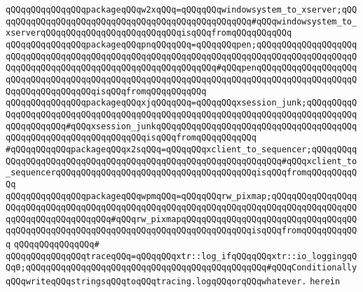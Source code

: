 \verb|qQQqqQQqqQQqqQQqpackageqQQqw2xqQQq=qQQqqQQqwindowsystem_to_xserver;qQQqqQQqqQQqqQQqqQQqqQQqqQQqqQQqqQQqqQQqqQQqqQQqqQQq#qQQqwindowsystem_to_xserverqQQqqQQqqQQqqQQqqQQqqQQqqQQqisqQQqfromqQQqqQQqqQQq|\newline
\verb|qQQqqQQqqQQqqQQqpackageqQQqpnqQQqqQQq=qQQqqQQqpen;qQQqqQQqqQQqqQQqqQQqqQQqqQQqqQQqqQQqqQQqqQQqqQQqqQQqqQQqqQQqqQQqqQQqqQQqqQQqqQQqqQQqqQQqqQQqqQQqqQQqqQQqqQQqqQQqqQQqqQQqqQQqqQQqqQQq#qQQqpenqQQqqQQqqQQqqQQqqQQqqQQqqQQqqQQqqQQqqQQqqQQqqQQqqQQqqQQqqQQqqQQqqQQqqQQqqQQqqQQqqQQqqQQqqQQqqQQqqQQqqQQqqQQqisqQQqfromqQQqqQQqqQQq|\newline
\verb|qQQqqQQqqQQqqQQqpackageqQQqxjqQQqqQQq=qQQqqQQqxsession_junk;qQQqqQQqqQQqqQQqqQQqqQQqqQQqqQQqqQQqqQQqqQQqqQQqqQQqqQQqqQQqqQQqqQQqqQQqqQQqqQQqqQQqqQQqqQQq#qQQqxsession_junkqQQqqQQqqQQqqQQqqQQqqQQqqQQqqQQqqQQqqQQqqQQqqQQqqQQqqQQqqQQqqQQqqQQqisqQQqfromqQQqqQQqqQQq|\newline
\verb|#qQQqqQQqqQQqpackageqQQqx2sqQQq=qQQqqQQqxclient_to_sequencer;qQQqqQQqqQQqqQQqqQQqqQQqqQQqqQQqqQQqqQQqqQQqqQQqqQQqqQQqqQQqqQQq#qQQqxclient_to_sequencerqQQqqQQqqQQqqQQqqQQqqQQqqQQqqQQqqQQqqQQqisqQQqfromqQQqqQQqqQQq|\newline
\verb|qQQqqQQqqQQqqQQqpackageqQQqwpmqQQq=qQQqqQQqrw_pixmap;qQQqqQQqqQQqqQQqqQQqqQQqqQQqqQQqqQQqqQQqqQQqqQQqqQQqqQQqqQQqqQQqqQQqqQQqqQQqqQQqqQQqqQQqqQQqqQQqqQQqqQQqqQQq#qQQqrw_pixmapqQQqqQQqqQQqqQQqqQQqqQQqqQQqqQQqqQQqqQQqqQQqqQQqqQQqqQQqqQQqqQQqqQQqqQQqqQQqqQQqqQQqisqQQqfromqQQqqQQqqQQq|\newline
\verb|qQQqqQQqqQQqqQQq#|\newline
\verb|qQQqqQQqqQQqqQQqtraceqQQq=qQQqqQQqxtr::log_ifqQQqqQQqxtr::io_loggingqQQq0;qQQqqQQqqQQqqQQqqQQqqQQqqQQqqQQqqQQqqQQqqQQqqQQq#qQQqConditionallyqQQqwriteqQQqstringsqQQqtoqQQqtracing.logqQQqorqQQqwhatever.|\newline
\verb|herein|\newline
\newline
\newline
